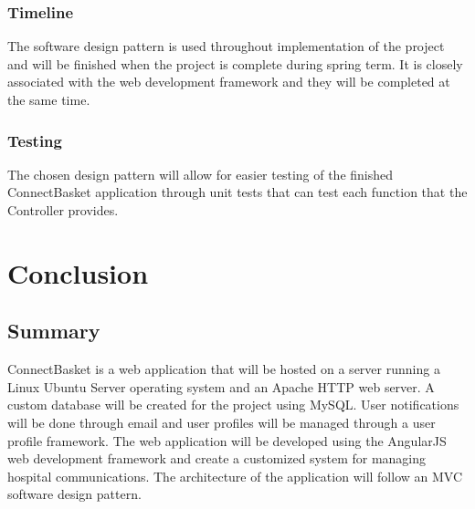 \documentclass[onecolumn, draftclsnofoot,10pt, compsoc]{IEEEtran}
\begin{document}
\subsubsection{Timeline}
The software design pattern is used throughout implementation of the project and will be finished when the project is complete during spring term. It is closely associated with the web development framework and they will be completed at the same time.


\subsubsection{Testing}
The chosen design pattern will allow for easier testing of the finished ConnectBasket application through unit tests that can test each function that the Controller provides.


\section{Conclusion}

\subsection{Summary}
ConnectBasket is a web application that will be hosted on a server running a Linux Ubuntu Server operating system and an Apache HTTP web server. A custom database will be created for the project using MySQL. User notifications will be done through email and user profiles will be managed through a user profile framework. The web application will be developed using the AngularJS web development framework and create a customized system for managing hospital communications. The architecture of the application will follow an MVC software design pattern.


\newpage
\nocite{*}


\end{document}
